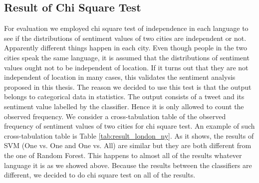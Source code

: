 \subsection{Result of Chi Square Test}
For evaluation we employed chi square test of independence in each language to see if the distributions of sentiment values of two cities are independent or not. 
Apparently different things happen in each city.
Even though people in the two cities speak the same language, it is assumed that the distributions of sentiment values ought not to be independent of location.  
If it turns out that they are not independent of location in many cases, this validates the sentiment analysis proposed in this thesis.
The reason we decided to use this test is that the output belongs to categorical data in statistics.
The output consists of a tweet and its sentiment value labelled by the classifier.
Hence it is only allowed to count the observed frequency.
We consider a cross-tabulation table of the observed frequency of sentiment values of two cities for chi square test.
An example of such cross-tabulation table is Table \ref{tab:result_london_ny}.
As it shows, the results of SVM (One vs. One and One vs. All) are similar but they are both different from the one of Random Forest.
This happens to almost all of the results whatever language it is as we showed above.
Because the results between the classifiers are different, we decided to do chi square test on all of the results.

